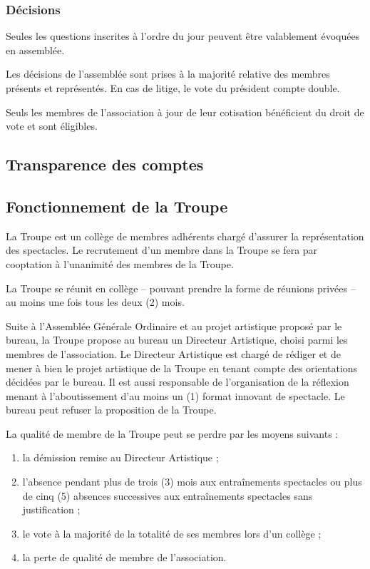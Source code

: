 \documentclass[a4paper,french,10pt]{article}
\begin{document}
\subsubsection{Décisions}
\label{sec:decisions}

Seules les questions inscrites à l’ordre du jour peuvent être
valablement évoquées en assemblée.

Les décisions de l’assemblée sont prises à la majorité relative des
membres présents et représentés. En cas de litige, le vote du
président compte double.

Seuls les membres de l’association à jour de leur cotisation
bénéficient du droit de vote et sont éligibles.

\subsection{Transparence des comptes}
\label{sec:transp-des-compt}

\subsection{Fonctionnement de la Troupe}
\label{sec:fonctionnement-troupe}
La Troupe est un collège de membres adhérents chargé d'assurer la représentation des spectacles. Le recrutement d'un membre dans la Troupe se fera par cooptation à l'unanimité des membres de la Troupe.

 La Troupe se réunit en collège -- pouvant prendre la forme de réunions privées -- au moins une fois tous les deux (2) mois.

Suite à l'Assemblée Générale Ordinaire et au projet artistique proposé par le bureau, la Troupe propose au bureau un Directeur Artistique, choisi parmi les membres de l'association. Le Directeur Artistique est chargé de rédiger et de mener à bien le projet artistique de la Troupe en tenant compte des orientations décidées par le bureau. Il est aussi responsable de l'organisation de la réflexion menant à l'aboutissement d'au moins un (1) format innovant de spectacle. Le bureau peut refuser la proposition de la Troupe. 

La qualité de membre de la Troupe peut se perdre par les moyens suivants :

\begin{enumerate}
	\item la démission remise au Directeur Artistique ;
	\item l'absence pendant plus de trois  (3) mois aux entraînements spectacles ou plus de cinq (5) absences successives aux entraînements spectacles sans justification ;
	\item le vote à la majorité de la totalité de ses membres lors d'un collège ;
	\item la perte de qualité de membre de l'association.

\end{enumerate}
\end{document}

